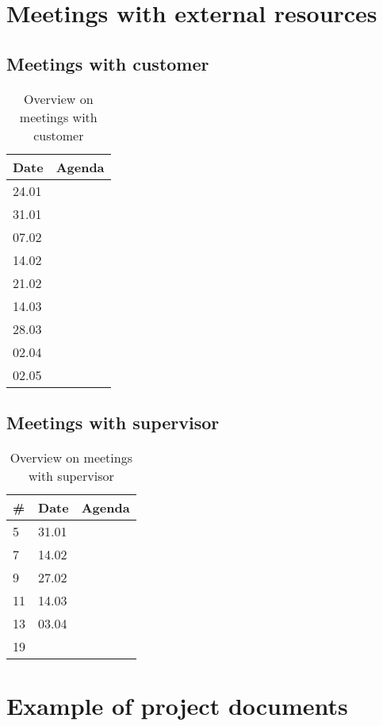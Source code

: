 \chapter{Meetings with external resources}
\section{Meetings with customer}
\begin{table}[H]
\centering
\begin{tabular}{|l|l|}
\hline
\textbf{Date}&\textbf{Agenda}\\\hline
24.01&\\\hline
31.01&\\\hline
07.02&\\\hline
14.02&\\\hline
21.02&\\\hline
14.03&\\\hline
28.03&\\\hline
02.04&\\\hline
02.05&\\\hline
\end{tabular}
\caption{Overview on meetings with customer}
\end{table}

\section{Meetings with supervisor}
\begin{table}[H]
\centering
\begin{tabular}{|l|l|l|}
\hline
\textbf{\#} & \textbf{Date}&\textbf{Agenda}\\\hline
5& 31.01&\\\hline
7 &14.02&\\\hline
9 &27.02&\\\hline
11 &14.03&\\\hline
13 &03.04&\\\hline
19&&\\\hline
\end{tabular}
\caption{Overview on meetings with supervisor}
\end{table}

\chapter{Example of project documents}


